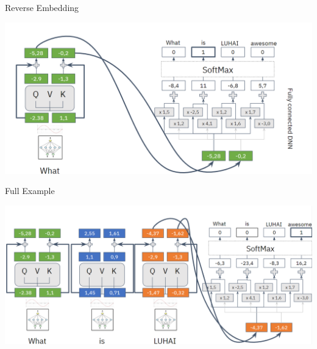 \documentclass[aspectratio=169]{../latex_main/tntbeamer}  %
\begin{document}
        \begin{frame}{Reverse Embedding}

            \centering
            \includegraphics[width=0.9\linewidth]{075_deep_learning/figures/transformer12.png}
        
        \end{frame}

        \begin{frame}{Full Example}

            \centering
            \includegraphics[width=0.9\linewidth]{075_deep_learning/figures/transformer13.png}
        
        \end{frame}
\end{document}
